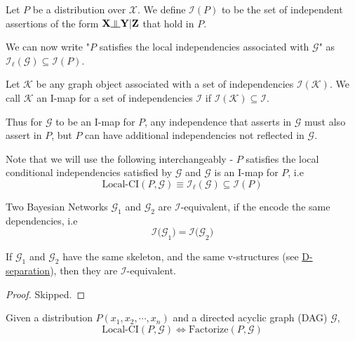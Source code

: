 \begin{defn}
Let $P$ be a distribution over $\mathcal X$. We define $\mathcal{I}(P)$ to be the set of independent assertions of the form $\mathbf X \ind \mathbf Y | \mathbf Z$ that hold in $P$.
\end{defn}
We can now write "$P$ satisfies the local independencies associated with $\mathcal  G$" as $\mathcal{I}_\ell(\mathcal G) \subseteq \mathcal{I}(P)$.
\begin{defn}
Let $\mathcal K$ be any graph object associated with a set of independencies $\mathcal{I}(\mathcal K)$. We call $\mathcal K$ an I-map for a set of independencies $\mathcal I$ if $\mathcal I(\mathcal K) \subseteq \mathcal I$.
\end{defn}
Thus for $\mathcal G$ to be an I-map for $P$, any independence that asserts in $\mathcal G$ must also assert in $P$, but $P$ can have additional independencies not reflected in $\mathcal G$.
\begin{rem}
Note that we will use the following interchangeably - $P$ satisfies the local conditional independencies satisfied by $\mathcal G$ and $\mathcal G$ is an I-map for $P$, i.e
\begin{equation}
	\text{Local-CI}(P, \mathcal G) \equiv \mathcal{I_\ell(G)} \subseteq \mathcal{I}(P)
\end{equation}
\end{rem}
\begin{defn}[I-equivalence]
Two Bayesian Networks $\mathcal{G}_1$ and $\mathcal{G}_2$ are $\mathcal{I}$-equivalent, if the encode the same dependencies, i.e
\begin{equation}
	\mathcal{I(G}_1) = \mathcal{I(G}_2)
\end{equation}
\end{defn}
\begin{thm}
If $\mathcal{G}_1$ and $\mathcal{G}_2$ have the same skeleton, and the same v-structures (see \hyperref[subsec:dsep]{D-separation}), then they are $\mathcal I$-equivalent.
\end{thm}
\begin{proof}
Skipped.
\end{proof}
\begin{thm}
Given a distribution $P(x_1, x_2, \cdots, x_n)$ and a directed acyclic graph (DAG) $\mathcal{G}$, 
\begin{equation}
\text{Local-CI}(P, \mathcal G) \Longleftrightarrow \text{Factorize}(P, \mathcal G)
\end{equation}
\end{thm}
